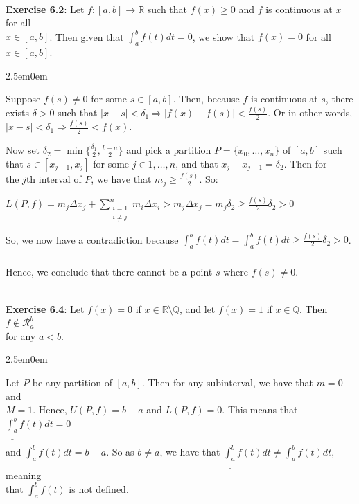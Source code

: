 \documentclass{book}
\newcommand{\pracTwo}{
   \color{Orange}%
   \fontsize{12}{14}\selectfont%
}
\newenvironment{myIndent}{%
   \begin{adjustwidth}{2.5em}{0em}%
}{%
   \end{adjustwidth}%
}
\newcommand{\mySepTwo}[1][.]{%
   {\noindent\color{#1}{\rule{6.5in}{0.5mm}}}\\%
}
\newcommand{\retTwo}{\hfill\bigbreak}
\begin{document}
\mySepTwo[Black]

\textbf{Exercise 6.2}: Let $f: [a, b] \longrightarrow \mathbb{R}$ such that $f(x) \geq 0$ and $f$ is continuous at $x$ for all\\ $x \in [a, b]$. Then given that $\int_a^b f(t)dt = 0$, we show that $f(x) = 0$ for all $x \in [a, b]$.\\ [-6pt]

{\begin{myIndent}\pracTwo
   Suppose $f(s) \neq 0$ for some $s \in [a, b]$. Then, because $f$ is continuous at $s$, there\\ exists $\delta > 0$ such that $|x - s| < \delta_1 \Longrightarrow |f(x) - f(s)| < \frac{f(s)}{2}$. Or in other words,\\ $|x - s| < \delta_1 \Longrightarrow \frac{f(s)}{2} < f(x)$.

   \newpage

   Now set $\delta_2 = \min\{\frac{\delta_1}{2}, \frac{b-a}{2}\}$ and pick a partition $P = \{x_0, \ldots, x_n\}$ of $[a, b]$ such\\ [2pt] that $s \in [x_{j-1}, x_j]$ for some $j \in {1, \ldots, n}$, and that $x_{j} - x_{j-1} = \delta_2$. Then for\\ the $j$th interval of $P$, we have that $m_j \geq \frac{f(s)}{2}$. So:

   {\center $L(P, f) = m_j\Delta x_j + \sum\limits_{
   \begin{smallmatrix}
      i=1\\
      i\neq j
   \end{smallmatrix}}^n m_i\Delta x_i > m_j\Delta x_j = m_j\delta_2 \geq \frac{f(s)}{2}\delta_2 > 0$ \retTwo\par}

   So, we now have a contradiction because $\int_a^b f(t)dt = \underline{\int_a^b}f(t)dt \geq \frac{f(s)}{2}\delta_2 > 0$.\retTwo

   Hence, we conclude that there cannot be a point $s$ where $f(s) \neq 0$.\retTwo
\end{myIndent}}

\mySepTwo[Black] 

\textbf{Exercise 6.4}: Let $f(x) = 0$ if $x \in \mathbb{R} \setminus \mathbb{Q}$, and let $f(x) = 1$ if $x \in \mathbb{Q}$. Then $f \notin \mathscr{R}_a^b$\\ for any $a < b$.\\ [-6pt]

{\begin{myIndent}\pracTwo
   Let $P$ be any partition of $[a, b]$. Then for any subinterval, we have that $m = 0$ and\\ $M = 1$. Hence, $U(P, f) = b - a$ and $L(P, f) = 0$. This means that $\underline{\int_a^b}f(t)dt = 0$\\ [-2pt] and  $\overline{\int_a^b}f(t)dt = b - a$. So as $ b \neq a$, we have that $\underline{\int_a^b}f(t)dt \neq \overline{\int_a^b}f(t)dt$, meaning\\ that $\int_a^b f(t)$ is not defined.
   \retTwo
\end{myIndent}}
\end{document}
